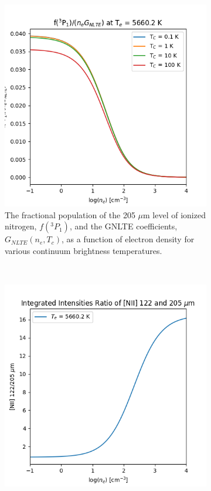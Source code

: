 \begin{figure}
    \centering
    \begin{subfigure}[t]{0.45\textwidth}
        \centering
        \includegraphics[width=\textwidth]{figs/carina/gnlte_curves.png}
        \caption{
        The fractional population of the 205 $\mu$m level of ionized nitrogen, $f(^3P_1)$, and the GNLTE coefficients, $G_{NLTE}(n_e,T_c)$, as a function of electron density for various continuum brightness temperatures.
        }
        \label{carina/fig:gnlte_curves}
    \end{subfigure}%
    ~
    \begin{subfigure}[t]{0.45\textwidth}
        \centering
        \includegraphics[width=\textwidth]{figs/carina/nii_curves.png}

\end{subfigure}
\end{figure}

